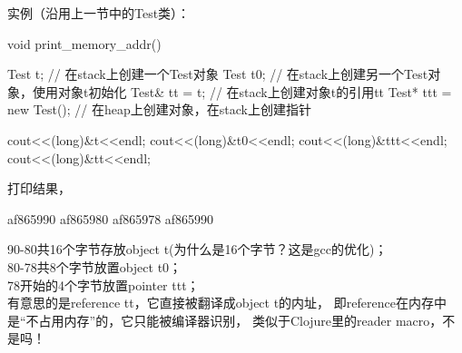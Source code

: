\documentclass[a4paper,11pt]{article}
\begin{document}
实例（沿用上一节中的Test类）：

\begin{cppcode}
void print_memory_addr() {
    Test t;   // 在stack上创建一个Test对象
    Test t0;  // 在stack上创建另一个Test对象，使用对象t初始化
    Test& tt = t; // 在stack上创建对象t的引用tt
    Test* ttt = new Test(); // 在heap上创建对象，在stack上创建指针

    cout<<(long)&t<<endl;
    cout<<(long)&t0<<endl;
    cout<<(long)&ttt<<endl;
    cout<<(long)&tt<<endl;
}
\end{cppcode}

打印结果，

\begin{bashcode}
af865990
af865980
af865978
af865990
\end{bashcode}

90-80共16个字节存放object t(为什么是16个字节？这是gcc的优化)；\\
80-78共8个字节放置object t0；\\
78开始的4个字节放置pointer ttt；\\
有意思的是reference tt，它直接被翻译成object t的内址，
即reference在内存中是“不占用内存”的，它只能被编译器识别，
类似于Clojure里的reader macro，不是吗！
\end{document}
